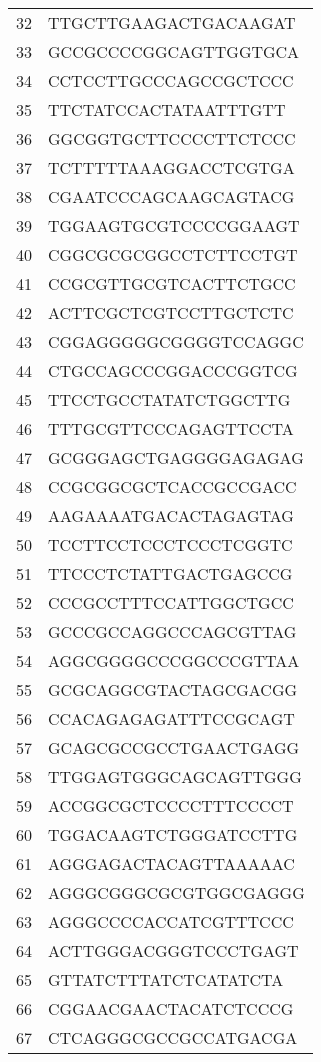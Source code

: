 \documentclass[letterpaper,12pt]{article}
\numberwithin{equation}{appendix}
\begin{document}
{{\begin{table}[ht]
\begin{tabular}{rl}
  32 & TTGCTTGAAGACTGACAAGAT \\ 
  33 & GCCGCCCCGGCAGTTGGTGCA \\ 
  34 & CCTCCTTGCCCAGCCGCTCCC \\ 
  35 & TTCTATCCACTATAATTTGTT \\ 
  36 & GGCGGTGCTTCCCCTTCTCCC \\ 
  37 & TCTTTTTAAAGGACCTCGTGA \\ 
  38 & CGAATCCCAGCAAGCAGTACG \\ 
  39 & TGGAAGTGCGTCCCCGGAAGT \\ 
  40 & CGGCGCGCGGCCTCTTCCTGT \\ 
  41 & CCGCGTTGCGTCACTTCTGCC \\ 
  42 & ACTTCGCTCGTCCTTGCTCTC \\ 
  43 & CGGAGGGGGCGGGGTCCAGGC \\ 
  44 & CTGCCAGCCCGGACCCGGTCG \\ 
  45 & TTCCTGCCTATATCTGGCTTG \\ 
  46 & TTTGCGTTCCCAGAGTTCCTA \\ 
  47 & GCGGGAGCTGAGGGGAGAGAG \\ 
  48 & CCGCGGCGCTCACCGCCGACC \\ 
  49 & AAGAAAATGACACTAGAGTAG \\ 
  50 & TCCTTCCTCCCTCCCTCGGTC \\ 
  51 & TTCCCTCTATTGACTGAGCCG \\ 
  52 & CCCGCCTTTCCATTGGCTGCC \\ 
  53 & GCCCGCCAGGCCCAGCGTTAG \\ 
  54 & AGGCGGGGCCCGGCCCGTTAA \\ 
  55 & GCGCAGGCGTACTAGCGACGG \\ 
  56 & CCACAGAGAGATTTCCGCAGT \\ 
  57 & GCAGCGCCGCCTGAACTGAGG \\ 
  58 & TTGGAGTGGGCAGCAGTTGGG \\ 
  59 & ACCGGCGCTCCCCTTTCCCCT \\ 
  60 & TGGACAAGTCTGGGATCCTTG \\ 
  61 & AGGGAGACTACAGTTAAAAAC \\ 
  62 & AGGGCGGGCGCGTGGCGAGGG \\ 
  63 & AGGGCCCCACCATCGTTTCCC \\ 
  64 & ACTTGGGACGGGTCCCTGAGT \\ 
  65 & GTTATCTTTATCTCATATCTA \\ 
  66 & CGGAACGAACTACATCTCCCG \\ 
  67 & CTCAGGGCGCCGCCATGACGA \\ 

\end{tabular}
\end{table}}}
\end{document}
